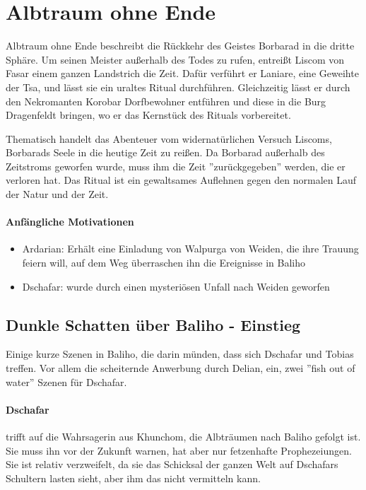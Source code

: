 \section{Albtraum ohne Ende}

Albtraum ohne Ende beschreibt die Rückkehr des Geistes Borbarad in die dritte Sphäre. Um seinen Meister außerhalb des Todes zu rufen, entreißt Liscom von Fasar einem ganzen Landstrich die Zeit. Dafür verführt er Laniare, eine Geweihte der Tsa, und lässt sie ein uraltes Ritual durchführen. Gleichzeitig lässt er durch den Nekromanten Korobar Dorfbewohner entführen und diese in die Burg Dragenfeldt bringen, wo er das Kernstück des Rituals vorbereitet.

Thematisch handelt das Abenteuer vom widernatürlichen Versuch Liscoms, Borbarads Seele in die heutige Zeit zu reißen. Da Borbarad außerhalb des Zeitstroms geworfen wurde, muss ihm die Zeit ''zurückgegeben'' werden, die er verloren hat. Das Ritual ist ein gewaltsames Auflehnen gegen den normalen Lauf der Natur und der Zeit.

\paragraph{Anfängliche Motivationen}

\begin{itemize}
	\item Ardarian: Erhält eine Einladung von Walpurga von Weiden, die ihre Trauung feiern will, auf dem Weg überraschen ihn die Ereignisse in Baliho
	\item Dschafar: wurde durch einen mysteriösen Unfall nach Weiden geworfen
\end{itemize}

\subsection{Dunkle Schatten über Baliho - Einstieg}
Einige kurze Szenen in Baliho, die darin münden, dass sich Dschafar und Tobias treffen. Vor allem die scheiternde Anwerbung durch Delian, ein, zwei ''fish out of water'' Szenen für Dschafar.

\paragraph{Dschafar} trifft auf die Wahrsagerin aus Khunchom, die Albträumen nach Baliho gefolgt ist. Sie muss ihn vor der Zukunft warnen, hat aber nur fetzenhafte Prophezeiungen. Sie ist relativ verzweifelt, da sie das Schicksal der ganzen Welt auf Dschafars Schultern lasten sieht, aber ihm das nicht vermitteln kann.

